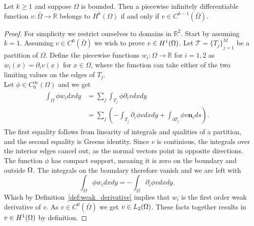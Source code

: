 
\begin{thmx}{\quad}
    Let $k\geq1$ and suppose $\Omega$ is bounded. Then a piecewise infinitely differentiable function $v:\bar{\Omega}\rightarrow \mathbb{R}$
    belongs to $H^k(\Omega)$ if and only if $v\in C^{k-1}(\bar{\Omega})$.
\end{thmx}

\begin{proof}
    For simplicity we restrict ourselves to domains in $\mathbb{R}^2$.
    Start by assuming $k=1$.
    Assuming $v\in C^0(\bar\Omega)$ we wish to prove $v\in H^1(\Omega)$. Let $\mathcal{T}={\{T_j\}}^M_{j=1}$ be a partition of $\Omega$.
    Define the piecewise functions $w_i:\Omega\rightarrow \mathbb{R}$ for $i=1,2$ as $w_i(x)=\partial_i v(x)$ for $x\in\Omega$,
     where the function can take either of the two limiting values on the edges of $T_j$. %
    \\
    Let $\phi\in C^{\infty}_0 (\Omega)$
   and we get
    \begin{align}
    \begin{split}
    \int_\Omega \phi w_i dxdy &= \sum_j\int_{T_j} \phi \partial_i v dx dy \\
        &= \sum_j \left( -\int_{T_j} \partial_i \phi v dxdy + \int_{\partial T_j} \phi v \mathbf{n}_i ds\right).
    \end{split}
    \end{align}
    The first equality follows from linearity of integrals and qualities of a partition, and the second equality is Greens identity.
    Since $v$ is continious, 
    the integrals over the interior edges cancel out,
    as the normal vectors point in opposite directions.
     The function $\phi$ has compact support, 
     meaning it is zero on the boundary and outside $\Omega$. 
     The integrals on the boundary therefore vanish and we are left with
    \begin{equation}
        \int_\Omega \phi w_i dxdy = -\int_\Omega \partial_i \phi v dxdy.
    \end{equation}
    Which by Definition~\ref{def:weak_derivative} implies that $w_i$ is the first order weak derivative of $v$.
    As $v\in C^0(\bar\Omega)$ we get $v \in L_2(\Omega)$. These facts together results in $v\in H^1(\Omega)$ by definition.


\end{proof}
